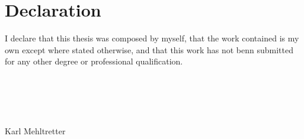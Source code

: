 \chapter*{Declaration}
I declare that this thesis was composed by myself, that the work contained is my own except where stated otherwise, and that this work has not benn submitted for any other degree or professional qualification.\\
\\
\\
\\
\\
\\
{\Large Karl Mehltretter}\\
